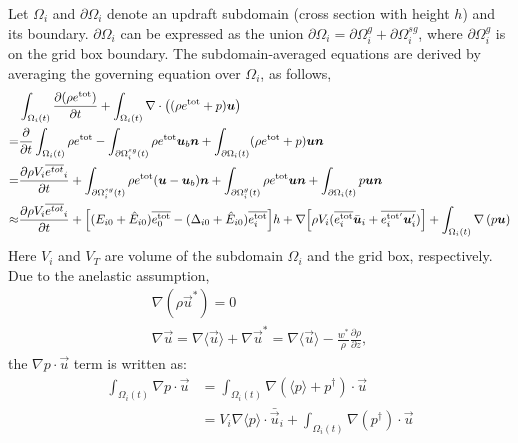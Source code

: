 \documentclass{report}
\begin{document}
Let $\Omega_i$ and $\partial \Omega_i$ denote an updraft subdomain (cross section with height $h$) and its boundary. $\partial \Omega_i$ can be expressed as the union $\partial\Omega_i = \partial\Omega_i^{g} + \partial\Omega_i^{sg}$, where $\partial\Omega_i^{g}$ is on the grid box boundary. The subdomain-averaged equations are derived by averaging the governing equation over $\Omega_i$, as follows, 
\begin{align*}
  & \int_{\Omega_i(t)}\frac{\partial (\rho e^\mathrm{tot})}{\partial t} + \int_{\Omega_i(t)}\nabla \cdot \left( (\rho e^\mathrm{tot} + p )\boldsymbol{{u}} \right)\\
 =& \frac{\partial}{\partial t}\int_{\Omega_i(t)} \rho e^\mathrm{tot} 
 - \int_{\partial \Omega_i^{sg}(t)} \rho e^\mathrm{tot} \boldsymbol{{u}}_b \boldsymbol{{n}}
 + \int_{\partial \Omega_i(t)} (\rho e^\mathrm{tot} + p) \boldsymbol{{u}} \boldsymbol{{n}}\\
 =& \frac{\partial \rho V_i \overline{e^{tot}}_i}{\partial t} 
 + \int_{\partial\Omega^{sg}_i(t)} \rho e^\mathrm{tot} (\boldsymbol{{u}} - \boldsymbol{{u}}_b)\boldsymbol{{n}}
 + \int_{\partial \Omega^{g}_i(t)} \rho e^\mathrm{tot} \boldsymbol{{u}} \boldsymbol{{n}} + \int_{\partial \Omega_i(t)} p \boldsymbol{{u}} \boldsymbol{{n}}\\
 \approx& \frac{\partial \rho V_i \overline{e^{tot}}_i}{\partial t} 
 + \Big[(E_{i0} + \hat{E}_{i0}) \overline{e_0^\mathrm{tot}}  - (\Delta_{i0} + \hat{E}_{i0}) \overline{e_i^\mathrm{tot}} \Big]h
 + \nabla\Big[\rho V_i(\overline{e_i^\mathrm{tot}} \bar{\boldsymbol{{u}}}_i + \overline{e^\mathrm{tot'}_i\boldsymbol{{u}}'_i})\Big] +  \int_{\Omega_i(t)} \nabla \left(p\boldsymbol{{u}}\right) \\
\end{align*}
Here $V_i$ and $V_T$ are volume of the subdomain $\Omega_i$ and the grid box, respectively. 
Due to the anelastic assumption, 
\begin{align*}
    \nabla (\rho \vec{u}^{*}) = 0\\
    \nabla \vec{u} = \nabla \langle\vec{u}\rangle + \nabla \vec{u}^* = \nabla \langle\vec{u}\rangle - \frac{w^{*}}{\rho}\frac{\partial \rho}{\partial z},
\end{align*} 
the $\nabla p \cdot \vec{u}$ term is written as:
\begin{align*}
    \int_{\Omega_i(t)} \nabla p \cdot \vec{u} &= \int_{\Omega_i(t)} \nabla(\langle p \rangle + p^{\dagger}) \cdot \vec{u}  \\
    & = V_i  \nabla\langle p \rangle  \cdot \bar{\vec{u}}_i  + \int_{\Omega_i(t)} \nabla(p^{\dagger}) \cdot \vec{u}  
\end{align*}
\end{document}
